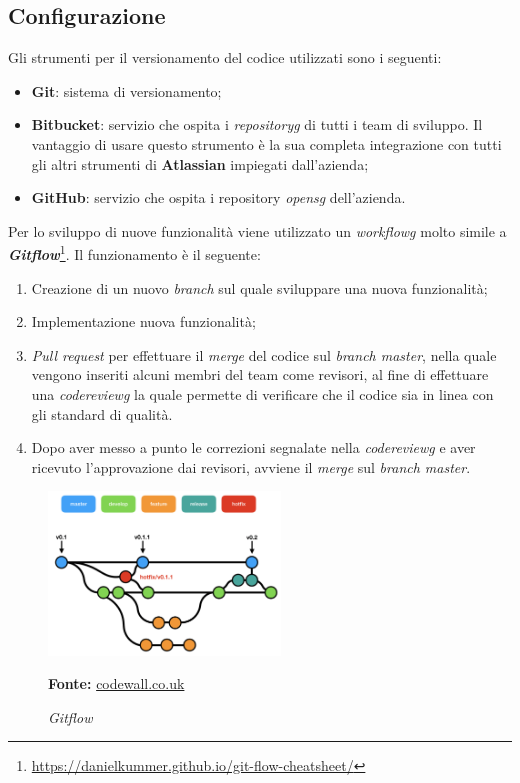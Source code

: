\subsection{Configurazione}\label{sec:configurazione}
Gli strumenti per il versionamento del codice utilizzati sono i seguenti:
\begin{itemize}
    \item \textbf{Git}: sistema di versionamento;
    \item \textbf{Bitbucket}: servizio che ospita i \textit{\gls{repositoryg}} di tutti i team di sviluppo. Il vantaggio di usare questo strumento è la sua completa integrazione con tutti gli altri strumenti di \textbf{Atlassian} impiegati dall'azienda;
    \item \textbf{GitHub}: servizio che ospita i repository \textit{\gls{opensg}} dell'azienda.
\end{itemize}
Per lo sviluppo di nuove funzionalità viene utilizzato un \textit{\gls{workflowg}} molto simile a \textbf{\textit{Gitflow}}\footnote{\url{https://danielkummer.github.io/git-flow-cheatsheet/}}. Il funzionamento è il seguente:
\begin{enumerate}
    \item Creazione di un nuovo \textit{branch} sul quale sviluppare una nuova funzionalità;
    \item Implementazione nuova funzionalità;
    \item \textit{Pull request} per effettuare il \textit{merge} del codice sul \textit{branch master}, nella quale vengono inseriti alcuni membri del team come revisori, al fine di effettuare una \textit{\gls{codereviewg}} la quale permette di verificare che il codice sia in linea con gli standard di qualità.
    \item Dopo aver messo a punto le correzioni segnalate nella \textit{\gls{codereviewg}} e aver ricevuto l'approvazione dai revisori, avviene il \textit{merge} sul \textit{branch master}.
\end{enumerate}
    \begin{figure}[h]
        \centering
        \includegraphics[width=0.55\textwidth]{immagini/git_flow.png}
        \caption{\textit{Gitflow}}
        \textbf{Fonte:} \href{https://www.codewall.co.uk/a-git-flow-explainer-how-to-tutorial/}{codewall.co.uk}
        \label{fig: Gitflow}
    \end{figure}

